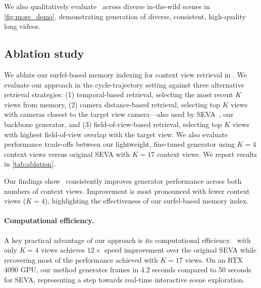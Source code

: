 We also qualitatively evaluate \mname~across diverse in-the-wild scenes in \cref{fig:more_demo}, demonstrating generation of diverse, consistent, high-quality long videos.

\subsection{Ablation study}%
\label{exp:ablation}


We ablate our surfel-based memory indexing for context view retrieval in \mname.
We evaluate our approach in the cycle-trajectory setting against three alternative retrieval strategies:
(1) temporal-based retrieval, selecting the most recent $K$ views from memory,
(2) camera distance-based retrieval, selecting top $K$ views with cameras closest to the target view camera—also used by SEVA~\cite{seva}, our backbone generator, and
(3) field-of-view-based retrieval, selecting top $K$ views with highest field-of-view overlap with the target view.
We also evaluate performance trade-offs between our lightweight, fine-tuned generator using $K=4$ context views versus original SEVA with $K=17$ context views.
We report results in \cref{tab:ablation}.

Our findings show \mname~consistently improves generator performance across both numbers of context views.
Improvement is most pronounced with fewer context views ($K=4$), highlighting the effectiveness of our surfel-based memory index.

\paragraph{Computational efficiency.}
A key practical advantage of our approach is its computational efficiency.
\mname~with only $K=4$ views achieves $12\times$ speed improvement over the original SEVA while recovering most of the performance achieved with $K=17$ views.
On an RTX 4090 GPU, our method generates frames in 4.2 seconds compared to 50 seconds for SEVA, representing a step towards real-time interactive scene exploration.
